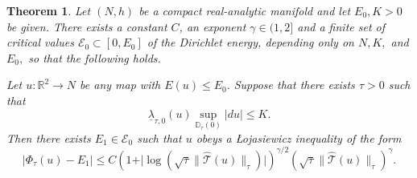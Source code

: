 \documentclass[10pt,reqno]{amsart}
\theoremstyle{plain}
\newtheorem{thm}[lemma]{Theorem}
\theoremstyle{definition}
\numberwithin{equation}{section}
\newcommand{\D}{\mathbb{D}}
\newcommand{\R}{\ensuremath{{\mathbb R}}}
\newcommand{\T}{{\mathcal T}}
\newcommand{\That}{{ \widehat{\T} }}
\newcommand{\abs}[1]{\vert#1\vert}
\begin{document}
\begin{thm}\label{thm:weightedloj} Let $(N, h)$ be a compact real-analytic manifold and let $E_0, K > 0$ be given. There exists a constant $C$, an exponent $\gamma\in (1,2]$ and a finite set of critical values $\mathcal{E}_0 \subset [ 0, E_0 ]$ of the Dirichlet energy, depending only on $N, K,$ and $E_0,$ so that the following holds.

Let $u : \R^2 \to N$ be any map with $E(u) \leq E_0.$ Suppose that there exists $\tau > 0$ such that
\begin{equation}\label{weightedloj:assumption}
    \underline{\lambda}_{\tau, 0}(u) \sup_{\D_{\tau}(0)} |du| \leq K.
\end{equation}
Then there exists $E_1 \in \mathcal{E}_0$ such that $u$ obeys a \L ojasiewicz inequality of the form
\begin{equation}\label{weightedloj:loj}
    |\Phi_\tau(u) - E_1 | \leq C \left( 1 + \abs{\log \left( \sqrt{\tau} \| \That(u) \|_\tau \right)} \right)^{\gamma / 2} \left( \sqrt{\tau} \| \That(u) \|_\tau \right)^\gamma.
\end{equation}
\end{thm}
\end{document}

